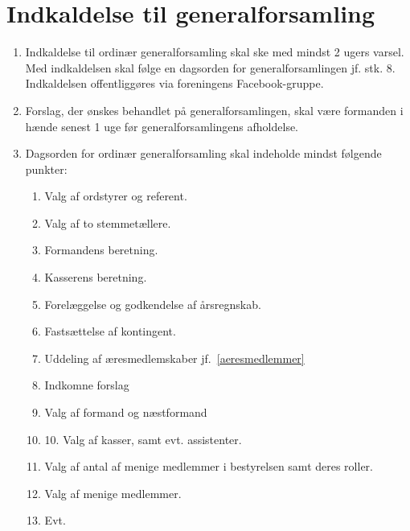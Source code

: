 \documentclass[a4paper, 10pt]{article}
\newenvironment{stykenum}{
  \begin{enumerate}[%
    label=Stk.~\arabic*:, ref=\textsection~\theenumi~Stk.~\arabic*, start=1]
}{\end{enumerate}}
\begin{document}
\section{Indkaldelse til generalforsamling}
\begin{stykenum}
    \item Indkaldelse til ordinær generalforsamling skal ske med mindst 2 ugers
        varsel. Med indkaldelsen skal følge en dagsorden for generalforsamlingen
        jf. stk. 8. Indkaldelsen offentliggøres via foreningens Facebook-gruppe.

    \item Forslag, der ønskes behandlet på generalforsamlingen, skal være
        formanden i hænde senest 1 uge før generalforsamlingens afholdelse.

    \item Dagsorden for ordinær generalforsamling skal indeholde mindst følgende
        punkter:
        \begin{enumerate}[label=\arabic*.]
            \item Valg af ordstyrer og referent.

            \item Valg af to stemmetællere.

            \item Formandens beretning.

            \item Kasserens beretning.

            \item Forelæggelse og godkendelse af årsregnskab.

            \item Fastsættelse af kontingent.

            \item Uddeling af æresmedlemskaber jf.~\ref{aeresmedlemmer}

            \item Indkomne forslag

            \item Valg af formand og næstformand

            \item 10. Valg af kasser, samt evt.  assistenter.

            \item Valg af antal af menige medlemmer i bestyrelsen samt deres
                roller.

            \item Valg af menige medlemmer.

            \item Evt.
        \end{enumerate}
\end{stykenum}
\end{document}
